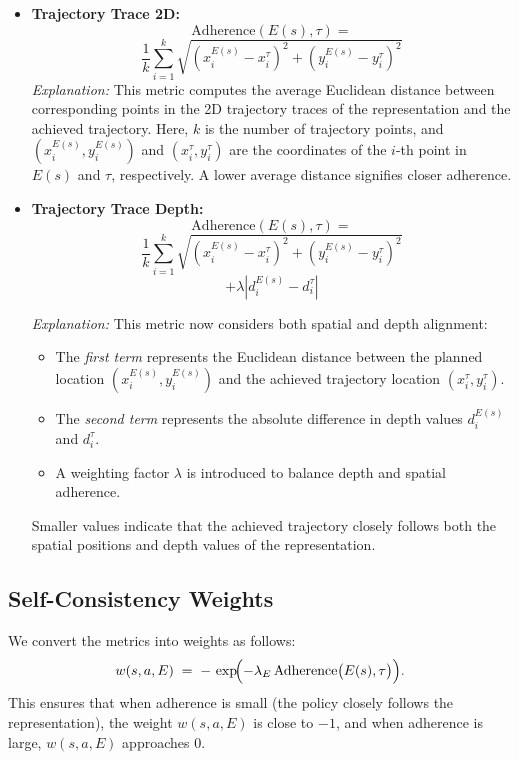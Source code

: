 \documentclass[conference,dvipsnames]{IEEEtran}
\begin{document}
\begin{itemize}
where:
\begin{itemize}
    \item \( (x_c + u, y_c + v) \) is the absolute pixel location of the grasp point.
    \item \( (x, y) \) are the pixel coordinates of a point in the trajectory \( \tau \).
\end{itemize}


    \item \textbf{Trajectory Trace 2D:} 
    $$\text{Adherence}(E(s), \tau) =$$
    $$ \frac{1}{k} \sum_{i=1}^{k} \sqrt{(x_i^{E(s)} - x_i^{\tau})^2 + (y_i^{E(s)} - y_i^{\tau})^2}$$
    \textit{Explanation:} This metric computes the average Euclidean distance between corresponding points in the 2D trajectory traces of the representation and the achieved trajectory. Here, \(k\) is the number of trajectory points, and \((x_i^{E(s)}, y_i^{E(s)})\) and \((x_i^{\tau}, y_i^{\tau})\) are the coordinates of the \(i\)-th point in \(E(s)\) and \(\tau\), respectively. A lower average distance signifies closer adherence.

\item \textbf{Trajectory Trace Depth:} 
    $$\text{Adherence}(E(s), \tau) = $$
    $$\frac{1}{k}\sum_{i=1}^{k} \sqrt{(x_i^{E(s)} - x_i^{\tau})^2 + (y_i^{E(s)} - y_i^{\tau})^2}$$ 
    $$+ \lambda |d_i^{E(s)} - d_i^{\tau}|$$
    
    \textit{Explanation:} This metric now considers both spatial and depth alignment:
    \begin{itemize}
        \item The \textit{first term} represents the Euclidean distance between the planned location \((x_i^{E(s)}, y_i^{E(s)})\) and the achieved trajectory location \((x_i^{\tau}, y_i^{\tau})\).
        \item The \textit{second term} represents the absolute difference in depth values \(d_i^{E(s)}\) and \(d_i^{\tau}\).
        \item A weighting factor $\lambda $ is introduced to balance depth and spatial adherence.
    \end{itemize}
    
    Smaller values indicate that the achieved trajectory closely follows both the spatial positions and depth values of the representation.

\end{itemize}


\subsection{Self-Consistency Weights}
\label{appendix:metrics}
We convert the metrics into weights as follows:
\[
w(s, a, E) \;=\; -\,\exp\!\Bigl(-\lambda_{E}\,\mathrm{Adherence}\bigl(E(s), \tau\bigr)\Bigr).
\]
This ensures that when adherence is small (the policy closely follows the representation), the weight \(w(s,a,E)\) is close to \(-1\), and when adherence is large, \(w(s,a,E)\) approaches 0.
\end{document}
